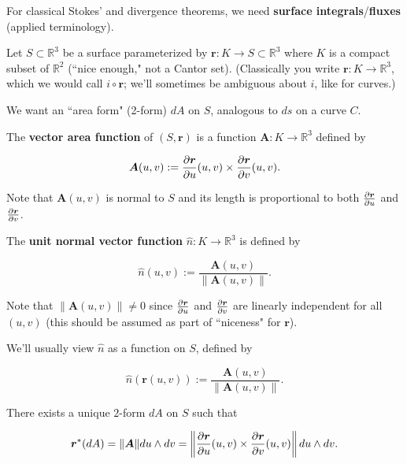 For classical Stokes' and divergence theorems, we need \textbf{surface integrals}/\textbf{fluxes} (applied terminology).

Let \(S \subset \mathbb{R}^3\) be a surface parameterized by \(\boldsymbol{r}: K \to S \subset\mathbb{R}^3\) where \(K\) is a compact subset of \(\mathbb{R}^2\) (``nice enough," not a Cantor set). (Classically you write \(\boldsymbol{r}: K \to \mathbb{R}^3\), which we would call \(i \circ \boldsymbol{r}\); we'll sometimes be ambiguous about \(i\), like for curves.)

We want an ``area form" (2-form) \(dA\) on \(S\), analogous to \(ds\) on a curve \(C\).

\begin{definition}

The \textbf{vector area function} of \((S, \boldsymbol{r})\) is a function \(\boldsymbol{A}: K \to \mathbb{R}^3\) defined by 

\[
\boldsymbol{A}(u, v) := \pderiv{\boldsymbol{r}}{u}(u,v) \times \pderiv{\boldsymbol{r}}{v}(u,v).
\]

Note that \(\boldsymbol{A}(u, v)\) is normal to \(S\) and its length is proportional to both \(\pderiv{\boldsymbol{r}}{u}\) and \(\pderiv{\boldsymbol{r}}{v}\).

The \textbf{unit normal vector function} \(\hat{n}: K \to \mathbb{R}^3\) is defined by

\[
\hat{n}(u,v):= \frac{\boldsymbol{A}(u,v)}{\lVert \boldsymbol{A}(u,v) \rVert}.
\]

Note that \(\lVert \boldsymbol{A}(u,v) \rVert \neq 0\) since \(\pderiv{\boldsymbol{r}}{u}\) and \(\pderiv{\boldsymbol{r}}{v}\) are linearly independent for all \((u,v)\) (this should be assumed as part of ``niceness" for \(\boldsymbol{r}\)).

We'll usually view \(\hat{n}\) as a function on \(S\), defined by 

\[
\hat{n}(\boldsymbol{r}(u,v)):= \frac{\boldsymbol{A}(u,v)}{\lVert \boldsymbol{A}(u,v) \rVert}.
\]

\end{definition}

\begin{proposition}

There exists a unique \(2\)-form \(dA\) on \(S\) such that 

\[
\boldsymbol{r}^*(dA) = \lVert \boldsymbol{A} \rVert du \wedge dv = \left\lVert   \pderiv{\boldsymbol{r}}{u}(u,v) \times \pderiv{\boldsymbol{r}}{v}(u,v) \right\rVert du \wedge dv.
\]

\end{proposition}

